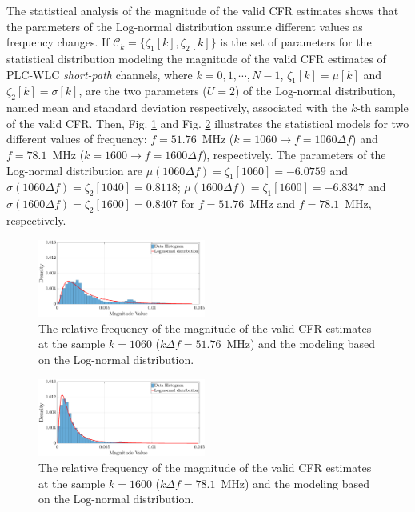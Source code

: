\documentclass[journal]{IEEEtran}
\begin{document}
The statistical analysis of the magnitude of the valid \ac{CFR} estimates shows that the parameters of the Log-normal distribution assume different values as frequency changes. If $\mathcal{C}_{k} = \{\zeta_1[k],\zeta_2[k]\}$ is the set of parameters for the statistical distribution modeling the magnitude of the valid \ac{CFR} estimates of \ac{PLC}-\ac{WLC} \textit{short-path} channels, where $k=0,1,\cdots,N-1$,  $\zeta_1[k] = \mu[k]$ and $\zeta_2[k] = \sigma[k]$, are the two parameters ($U=2$) of the Log-normal distribution, named mean and standard deviation respectively, associated with the $k$-th sample of the valid \ac{CFR}. Then, Fig. \ref{mag_examplelW} and Fig. \ref{mag_example2lW} illustrates the statistical models for two different values of frequency: $f=51.76$~MHz ($k=1060 \rightarrow f = 1060\Delta f$) and $f=78.1$~MHz ($k=1600 \rightarrow f = 1600\Delta f$), respectively. The parameters of the Log-normal distribution are  $\mu(1060 \Delta f) = \zeta_1[1060]=-6.0759$ and $\sigma( 1060 \Delta f) = \zeta_2[1040] = 0.8118$; $\mu(1600 \Delta f) = \zeta_1[1600] = -6.8347$ and $\sigma( 1600 \Delta f) = \zeta_2[1600]=0.8407$ for $f=51.76$~MHz and $f=78.1$~MHz, respectively.

\begin{figure}[h!]
	\centering
	\includegraphics[width=0.49\textwidth]{images/Mag_histlW_2.eps}
	\caption{The relative frequency of the magnitude of the valid CFR estimates at the sample $k = 1060$ ($k\Delta f= 51.76$~MHz) and the modeling based on the Log-normal distribution.}
	\label{mag_examplelW}
\end{figure}

\begin{figure}[h!]
	\centering
	\includegraphics[width=0.49\textwidth]{images/Mag_hist2lW_2.eps}
	\caption{ The relative frequency of the magnitude of the valid CFR estimates at the sample $k = 1600$ ($k\Delta f= 78.1$~MHz) and the modeling based on the Log-normal distribution.}
	\label{mag_example2lW}
\end{figure}
\end{document}
